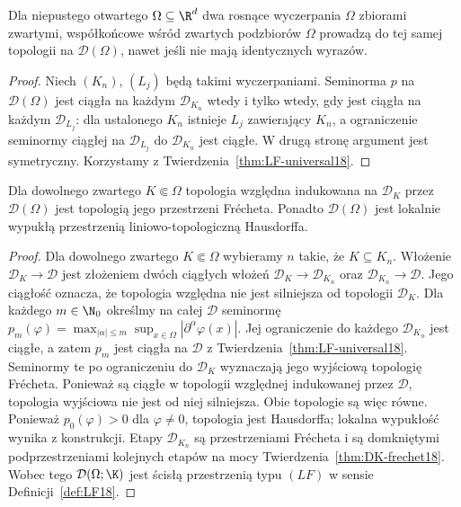\begin{stwierdzenie}
\label{prop:D-independence18}
Dla niepustego otwartego $\Omega\subseteq\R^d$ dwa rosnące
wyczerpania $\Omega$ zbiorami zwartymi, współkońcowe
wśród zwartych podzbiorów $\Omega$ prowadzą do tej samej
topologii na $\mathcal D(\Omega)$, nawet jeśli nie mają
identycznych wyrazów.
\end{stwierdzenie}
\begin{proof}
Niech $(K_n)$, $(L_j)$ będą takimi wyczerpaniami.
Seminorma $p$ na $\mathcal D(\Omega)$ jest ciągła na
każdym $\mathcal D_{K_n}$ wtedy i tylko wtedy, gdy jest
ciągła na każdym $\mathcal D_{L_j}$: dla ustalonego $K_n$
istnieje $L_j$ zawierający $K_n$, a ograniczenie seminormy
ciągłej na $\mathcal D_{L_j}$ do $\mathcal D_{K_n}$ jest
ciągłe. W drugą stronę argument jest symetryczny.
Korzystamy z Twierdzenia~\ref{thm:LF-universal18}.
\end{proof}

\begin{twierdzenie}
\label{thm:D-stage18}
Dla dowolnego zwartego $K\Subset\Omega$ topologia względna
indukowana na $\mathcal D_K$ przez $\mathcal D(\Omega)$
jest topologią jego przestrzeni Fr\'echeta.
Ponadto $\mathcal D(\Omega)$ jest lokalnie wypukłą
przestrzenią liniowo-topologiczną Hausdorffa.
\end{twierdzenie}
\begin{proof}
Dla dowolnego zwartego $K\Subset\Omega$ wybieramy $n$
takie, że $K\subseteq K_n$. Włożenie $\mathcal D_K\to\mathcal D$
jest złożeniem dwóch ciągłych włożeń
$\mathcal D_K\to\mathcal D_{K_n}$ oraz
$\mathcal D_{K_n}\to\mathcal D$. Jego ciągłość oznacza, że
topologia względna nie jest silniejsza od topologii
$\mathcal D_K$. Dla każdego $m\in\N_0$ określmy na
całej $\mathcal D$ seminormę
$p_m(\varphi)=\max_{|\alpha|\le m}\sup_{x\in\Omega}
|\partial^\alpha\varphi(x)|$. Jej ograniczenie do
każdego $\mathcal D_{K_n}$ jest ciągłe, a zatem $p_m$
jest ciągła na $\mathcal D$ z
Twierdzenia~\ref{thm:LF-universal18}. Seminormy te
po ograniczeniu do $\mathcal D_K$ wyznaczają jego wyjściową
topologię Frécheta. Ponieważ są ciągłe w topologii względnej
indukowanej przez $\mathcal D$, topologia wyjściowa nie
jest od niej silniejsza. Obie topologie są więc równe.
Ponieważ $p_0(\varphi)>0$ dla $\varphi\ne0$, topologia
jest Hausdorffa; lokalna wypukłość wynika z konstrukcji.
Etapy $\mathcal D_{K_n}$ są przestrzeniami Frécheta
i są domkniętymi podprzestrzeniami kolejnych etapów
na mocy Twierdzenia~\ref{thm:DK-frechet18}.
Wobec tego $\mathcal D(\Omega;\K)$ jest ścisłą przestrzenią
typu $(LF)$ w sensie Definicji~\ref{def:LF18}.
\end{proof}

